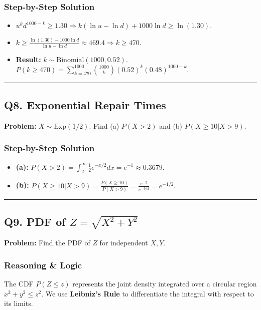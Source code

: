 \documentclass[11pt]{article}
\begin{document}
\subsubsection*{Step-by-Step Solution}
\begin{itemize}
    \item $u^k d^{1000-k} \ge 1.30 \Rightarrow k(\ln u - \ln d) + 1000 \ln d \ge \ln(1.30)$.
    \item $k \ge \frac{\ln(1.30) - 1000 \ln d}{\ln u - \ln d} \approx 469.4 \Rightarrow k \ge 470$.
    \item \textbf{Result:} $k \sim \text{Binomial}(1000, 0.52)$. $P(k \ge 470) = \sum_{k=470}^{1000}\binom{1000}{k}(0.52)^k(0.48)^{1000-k}$.
\end{itemize}

\vspace{0.5cm}
\hrule
\vspace{0.5cm}

\subsection*{Q8. Exponential Repair Times}

\textbf{Problem:} $X \sim \text{Exp}(1/2)$. Find (a) $P(X>2)$ and (b) $P(X \ge 10 | X > 9)$.

\subsubsection*{Step-by-Step Solution}
\begin{itemize}
    \item \textbf{(a):} $P(X>2) = \int_{2}^{\infty}\frac{1}{2}e^{-x/2}dx = e^{-1} \approx 0.3679$.
    \item \textbf{(b):} $P(X \ge 10 | X > 9) = \frac{P(X \ge 10)}{P(X > 9)} = \frac{e^{-5}}{e^{-9/2}} = e^{-1/2}$.
\end{itemize}

\vspace{0.5cm}
\hrule
\vspace{0.5cm}

\subsection*{Q9. PDF of $Z = \sqrt{X^2+Y^2}$}

\textbf{Problem:} Find the PDF of $Z$ for independent $X, Y$.

\subsubsection*{Reasoning \& Logic}
The CDF $P(Z \le z)$ represents the joint density integrated over a circular region $x^2 + y^2 \le z^2$. We use \textbf{Leibniz's Rule} to differentiate the integral with respect to its limits.
\end{document}
